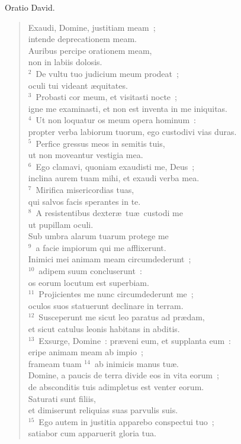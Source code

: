\lettrine[lines=3,image=true,loversize=0.05,lraise=-0.03]{O}{}ratio David. \begin{flushleft}\begin{verse}\vspace{6pt}Exaudi, Domine, justitiam meam~;\\ intende deprecationem meam.\\ Auribus percipe orationem meam,\\ non in labiis dolosis.\\
${}^{2}$~De vultu tuo judicium meum prodeat~;\\ oculi tui videant \ae quitates.\\
${}^{3}$~Probasti cor meum, et visitasti nocte~;\\ igne me examinasti, et non est inventa in me iniquitas.\\
${}^{4}$~Ut non loquatur os meum opera hominum~:\\ propter verba labiorum tuorum, ego custodivi vias duras.\\
${}^{5}$~Perfice gressus meos in semitis tuis,\\ ut non moveantur vestigia mea.\\
${}^{6}$~Ego clamavi, quoniam exaudisti me, Deus~;\\ inclina aurem tuam mihi, et exaudi verba mea.\\
${}^{7}$~Mirifica misericordias tuas,\\ qui salvos facis sperantes in te.\\
${}^{8}$~A resistentibus dexter\ae\ tu\ae\ custodi me\\ ut pupillam oculi.\\ Sub umbra alarum tuarum protege me\\
${}^{9}$~a facie impiorum qui me afflixerunt.\\ Inimici mei animam meam circumdederunt~;\\
${}^{10}$~adipem suum concluserunt~:\\ os eorum locutum est superbiam.\\
${}^{11}$~Projicientes me nunc circumdederunt me~;\\ oculos suos statuerunt declinare in terram.\\
${}^{12}$~Susceperunt me sicut leo paratus ad pr\ae dam,\\ et sicut catulus leonis habitans in abditis.\\
${}^{13}$~Exsurge, Domine~: pr\ae veni eum, et supplanta eum~:\\ eripe animam meam ab impio~;\\ frameam tuam
${}^{14}$~ab inimicis manus tu\ae .\\ Domine, a paucis de terra divide eos in vita eorum~;\\ de absconditis tuis adimpletus est venter eorum.\\ Saturati sunt filiis,\\ et dimiserunt reliquias suas parvulis suis.\\
${}^{15}$~Ego autem in justitia apparebo conspectui tuo~;\\ satiabor cum apparuerit gloria tua.\end{verse}\end{flushleft}
